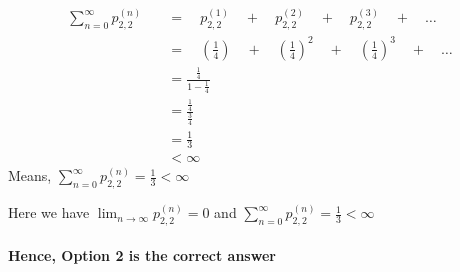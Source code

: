 \documentclass{article}
\begin{document}
\begin{equation}
    \begin{split}
    \sum_{n=0}^{\infty} p_{2,2}^{(n)} \quad & = \quad p_{2,2}^{(1)} \quad +  \quad p_{2,2}^{(2)} \quad  + \quad p_{2,2}^{(3)} \quad + \quad \dots \\
    & = \quad \left( \frac{1}{4} \right) \quad + \quad \left( \frac{1}{4} \right)^2 \quad + \quad \left( \frac{1}{4} \right)^3 \quad + \quad \dots \\
    & = \frac{\frac{1}{4}}{1 - \frac{1}{4}} \\
    & = \frac{\frac{1}{4}}{\frac{3}{4}} \\
    & = \frac{1}{3} \\
    & < \infty
    \end{split}
\end{equation}
Means, \quad \(\sum_{n=0}^{\infty} p_{2,2}^{(n)} = \frac{1}{3} < \infty\)

Here we have \quad \(\lim_{n\to\infty} p_{2,2}^{(n)} = 0\) and \quad \(\sum_{n=0}^{\infty} p_{2,2}^{(n)} = \frac{1}{3} < \infty\) \\\\
\textbf{Hence, Option 2 is the correct answer}
\end{document}
